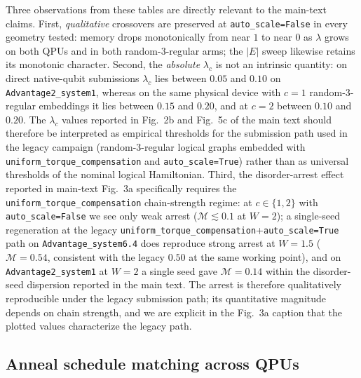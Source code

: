 \documentclass[aps,prapplied,reprint,superscriptaddress,floatfix,nofootinbib]{revtex4-2}
\begin{document}
Three observations from these tables are directly relevant to the main-text claims.
First, \emph{qualitative} crossovers are preserved at \texttt{auto\_scale=False} in every geometry tested: memory drops monotonically from near $1$ to near $0$ as $\lambda$ grows on both QPUs and in both random-3-regular arms; the $|E|$ sweep likewise retains its monotonic character.
Second, the \emph{absolute} $\lambda_c$ is not an intrinsic quantity: on direct native-qubit submissions $\lambda_c$ lies between $0.05$ and $0.10$ on \texttt{Advantage2\_system1}, whereas on the same physical device with $c=1$ random-3-regular embeddings it lies between $0.15$ and $0.20$, and at $c=2$ between $0.10$ and $0.20$.
The $\lambda_c$ values reported in Fig.~2b and Fig.~5c of the main text should therefore be interpreted as empirical thresholds for the submission path used in the legacy campaign (random-3-regular logical graphs embedded with \texttt{uniform\_torque\_compensation} and \texttt{auto\_scale=True}) rather than as universal thresholds of the nominal logical Hamiltonian.
Third, the disorder-arrest effect reported in main-text Fig.~3a specifically requires the \texttt{uniform\_torque\_compensation} chain-strength regime: at $c\in\{1,2\}$ with \texttt{auto\_scale=False} we see only weak arrest ($\mathcal{M}\lesssim 0.1$ at $W=2$); a single-seed regeneration at the legacy \texttt{uniform\_torque\_compensation}+\texttt{auto\_scale=True} path on \texttt{Advantage\_system6.4} does reproduce strong arrest at $W=1.5$ ($\mathcal{M}=0.54$, consistent with the legacy $0.50$ at the same working point), and on \texttt{Advantage2\_system1} at $W=2$ a single seed gave $\mathcal{M}=0.14$ within the disorder-seed dispersion reported in the main text.
The arrest is therefore qualitatively reproducible under the legacy submission path; its quantitative magnitude depends on chain strength, and we are explicit in the Fig.~3a caption that the plotted values characterize the legacy path.

\subsection{Anneal schedule matching across QPUs}
\label{sec:schedule}
\end{document}
